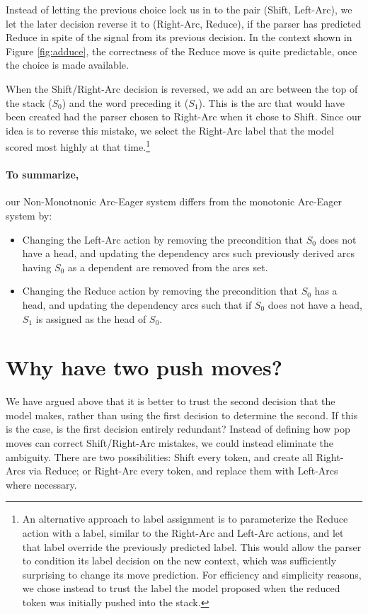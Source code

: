 \documentclass[11pt,letterpaper]{article}
\begin{document}
Instead of letting the previous choice lock us in to the pair (Shift, Left-Arc), we let
the later decision reverse it to (Right-Arc, Reduce), if the parser has predicted
Reduce in spite of the signal from its previous decision.
In the context shown in Figure \ref{fig:adduce}, the correctness of the Reduce
move is quite predictable, once the choice is made available.

When the Shift/Right-Arc decision is reversed, we add an arc between the top
of the stack ($S_0$)
and the word preceding it ($S_1$). This is the arc that would have been created had the parser
chosen to Right-Arc when it chose to Shift. Since our idea is to reverse this mistake,
we select the Right-Arc label that the model scored most highly at that
time.\footnote{An alternative approach to label assignment is to parameterize
the Reduce action with a label, similar to the Right-Arc and Left-Arc actions,
and let that label override the previously predicted label. This would allow the
parser to condition its label decision on the new context, which was sufficiently
surprising to change its move prediction.
For efficiency and simplicity reasons, we chose instead to trust the label the model
proposed when the reduced token was initially pushed into the stack.}

\noindent\paragraph{To summarize,} our Non-Monotnonic Arc-Eager system
differs from the monotonic Arc-Eager system by:
\begin{itemize}
   \item Changing the Left-Arc action by removing the precondition that $S_0$
   does not have a head, and updating the dependency arcs such previously
   derived arcs having $S_0$ as a dependent are removed from the arcs set.

   \item Changing the Reduce action by removing the precondition that $S_0$
   has a head, and updating the dependency arcs such that if $S_0$ does not have
   a head, $S_1$ is assigned as the head of $S_0$.
\end{itemize}


\section{Why have two push moves?}
\label{sec:shiftless}

We have argued above that it is better to trust the second decision that the model
makes, rather than using the first decision to determine the second. If this is
the case, is the first decision entirely redundant?
Instead of defining how pop moves can correct Shift/Right-Arc mistakes, we could
instead eliminate the ambiguity. There are two possibilities:
Shift every token, and create all Right-Arcs via Reduce; or Right-Arc every token,
and replace them with Left-Arcs where necessary.
\end{document}
